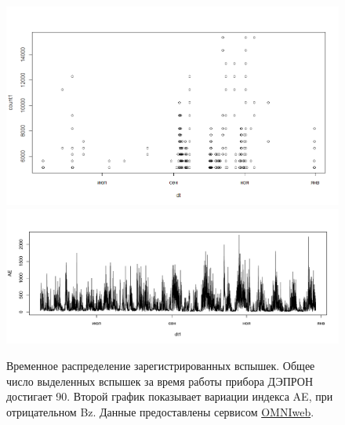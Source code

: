 \begin{figure}[h]
	\centering
	\includegraphics[width=0.7\linewidth, trim={0 2cm 0 0}]{images/Flash/Rplot03.png}
	\includegraphics[width=0.7\linewidth, trim={0 1.5cm 0 0}]{images/Flash/Rplot01}
	\caption{Временное распределение зарегистрированных вспышек. Общее число выделенных вспышек за время работы прибора ДЭПРОН достигает 90. Второй график показывает вариации индекса AE, при отрицательном Bz. Данные предоставлены сервисом  \href{https://omniweb.gsfc.nasa.gov/}{OMNIweb}.}
	\label{fig:rplot03}
\end{figure}


